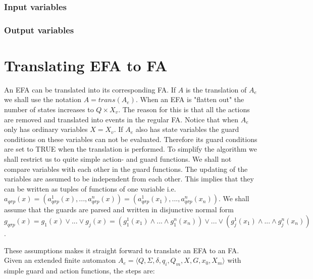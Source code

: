 \documentclass{article}
\begin{document}
\subsubsection{Input variables}

\subsubsection{Output variables}


\section{Translating EFA to FA}

An EFA can be translated into its corresponding FA.
If $A$ is the translation of $A_e$ we shall use the notation
$A=trans(A_e)$. When an EFA is "flatten out" the number of states
increases to $Q \times X_v $. The reason for this is that all the
actions are removed and translated into events in the regular FA. Notice
that when $A_e$ only has ordinary variables $X=X_v$. If $A_e$ also has
state variables the guard conditions on these variables can not be evaluated. Therefore its guard conditions are set to
TRUE when the translation is performed. To simplify the
algorithm we shall restrict us to quite simple action- and guard
functions. We shall not compare variables with each other in the guard functions.
The updating of the variables are assumed to be independent
from each other. This implies that they can be written as
tuples of functions of one variable i.e.
$a_{q \sigma p}(x)=(a^1_{q \sigma p}(x),...,a^n_{q \sigma p}(x))=(a^1_{q
\sigma p}(x_1),...,a^n_{q \sigma p}(x_n))$. We shall assume that the
guards are parsed and written in disjunctive normal form $g_{q
\sigma p}(x)=g_1(x)\vee ...\vee g_j(x)= (g^{1}_{1}(x_1)\wedge
...\wedge g^{n}_{1}(x_n) )\vee ...\vee (g^{1}_{j}(x_1)\wedge
...\wedge g^{n}_{j}(x_n) )$.

These assumptions makes it
straight forward to translate an EFA to an FA. Given an extended
finite automaton $A_{e}=\langle Q, \Sigma, \delta, q_i, Q_m, X, G
,x_0, X_m \rangle$ with simple guard and
action functions, the steps are:\\
\end{document}
